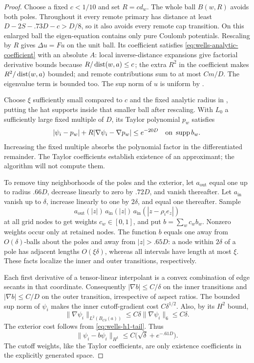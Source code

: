 \begin{proof}
Choose a fixed \(c<1/10\) and set \(R=c d_w\).
The whole ball \(B(w,R)\) avoids both poles. Throughout it every remote
primary has distance at least \(D-2S-.73D-c>D/8\), so it also avoids
every remote cap transition. On this enlarged ball the eigen-equation
contains only pure Coulomb potentials. Rescaling by \(R\) gives
\(\Delta u=Fu\) on the unit ball. Its coefficient satisfies
\eqref{eq:wells-analytic-coefficient} with an absolute \(A\):
local inverse-distance expansions give factorial derivative bounds
because \(R/\operatorname{dist}(w,a)\le c\); the extra \(R^2\) in the coefficient
makes \(R^2/\operatorname{dist}(w,a)\) bounded; and remote contributions sum to at
most \(Cm/D\). The eigenvalue term is bounded too.
The sup norm of \(u\) is uniform by .

Choose \(\xi\) sufficiently small compared to \(c\) and the fixed
analytic radius in , putting the hat supports
inside that smaller ball after rescaling. With \(L_0\) a sufficiently
large fixed multiple of \(D\), its Taylor polynomial \(p_w\) satisfies
\begin{equation}
 |\psi_i-p_w|+R|\nabla\psi_i-\nabla p_w|\le e^{-20D}
 \quad\text{on }\operatorname{supp} b_w.
 \label{eq:wells-taylor-error}
\end{equation}
Increasing the fixed multiple absorbs the polynomial factor in the
differentiated remainder. The Taylor coefficients establish existence
of an approximant; the algorithm will not compute them.

To remove tiny neighborhoods of the poles and the exterior, let
\(a_{\mathrm{out}}\) equal one up to radius \(.66D\), decrease linearly
to zero by \(.72D\), and vanish thereafter. Let \(a_{\mathrm{in}}\) vanish
up to \(\delta\), increase linearly to one by \(2\delta\), and equal one
thereafter. Sample
\[
 a_{\mathrm{out}}(|z|)\,
 a_{\mathrm{in}}(|z|)\,
 a_{\mathrm{in}}(|z-\rho_i e_z|)
\]
at all grid nodes to get weights \(c_w\in[0,1]\), and put
\(b=\sum_w c_wb_w\). Nonzero weights occur only at retained nodes.
The function \(b\) equals one away from \(O(\delta)\)-balls about the
poles and away from \(|z|>.65D\): a node within \(2\delta\) of a pole
has adjacent lengths \(O(\xi\delta)\), whereas all intervals have
length at most \(\xi\). These facts localize the inner and outer
transitions, respectively.

Each first derivative of a tensor-linear interpolant is a convex
combination of edge secants in that coordinate. Consequently
\(|\nabla b|\le C/\delta\) on the inner transitions and
\(|\nabla b|\le C/D\) on the outer transition, irrespective of aspect
ratios. The bounded sup norm of \(\psi_i\) makes the inner
cutoff-gradient cost \(C\delta^{1/2}\). Also, by its \(H^2\) bound,
\[
 \|\nabla\psi_i\|_{L^2(B_{C\delta}(a))}
 \le C\delta\|\nabla\psi_i\|_6\le C\delta.
\]
The exterior cost follows from \eqref{eq:wells-h1-tail}. Thus
\begin{equation}
 \|\psi_i-b\psi_i\|_{H^1}
 \le C\bigl(\sqrt\delta+e^{-.61D}\bigr).
 \label{eq:wells-cutoff-error}
\end{equation}
The cutoff weights, like the Taylor coefficients, are only existence
coefficients in the explicitly generated space.


\end{proof}
